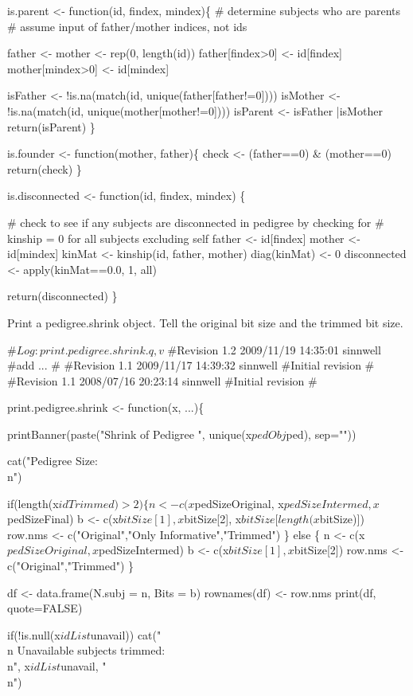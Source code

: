 \documentclass{article}
\begin{document}
\begin{enumerate}
is.parent <- function(id, findex, mindex)\{
  # determine subjects who are parents
  # assume input of father/mother indices, not ids
  
  father <- mother <- rep(0, length(id))
  father[findex>0] <- id[findex]
  mother[mindex>0] <- id[mindex]
  
  isFather <- !is.na(match(id, unique(father[father!=0])))
  isMother <- !is.na(match(id, unique(mother[mother!=0])))
  isParent <- isFather |isMother
  return(isParent)
\}

is.founder <- function(mother, father)\{
  check <- (father==0) & (mother==0)
  return(check)
\}


is.disconnected <- function(id, findex, mindex)
\{

  # check to see if any subjects are disconnected in pedigree by checking for
  # kinship = 0 for all subjects excluding self
  father <- id[findex]
  mother <- id[mindex]  
  kinMat <- kinship(id, father, mother)
  diag(kinMat) <- 0
  disconnected <- apply(kinMat==0.0, 1, all)

  return(disconnected)
\}

\nwendcode{}\nwdocspar


Print a pedigree.shrink object.  Tell the original bit size and the trimmed bit size.

\nwenddocs{}\endmoddef
#$Log: print.pedigree.shrink.q,v $
#Revision 1.2  2009/11/19 14:35:01  sinnwell
#add ...
#
#Revision 1.1  2009/11/17 14:39:32  sinnwell
#Initial revision
#
#Revision 1.1  2008/07/16 20:23:14  sinnwell
#Initial revision
#

print.pedigree.shrink <- function(x, ...)\{

  printBanner(paste("Shrink of Pedigree ", unique(x$pedObj$ped), sep=""))
 
  cat("Pedigree Size:\\n")

  if(length(x$idTrimmed) > 2)
    \{
      n <- c(x$pedSizeOriginal, x$pedSizeIntermed, x$pedSizeFinal)
      b <- c(x$bitSize[1], x$bitSize[2], x$bitSize[length(x$bitSize)])
      row.nms <- c("Original","Only Informative","Trimmed")
    \} else \{
      n <- c(x$pedSizeOriginal, x$pedSizeIntermed)
      b <- c(x$bitSize[1], x$bitSize[2])
      row.nms <- c("Original","Trimmed")
    \}

  df <- data.frame(N.subj = n, Bits = b)
  rownames(df) <- row.nms
  print(df, quote=FALSE)
  
  
  if(!is.null(x$idList$unavail)) 
    cat("\\n Unavailable subjects trimmed:\\n", x$idList$unavail, "\\n")
  

\end{enumerate}
\end{document}
